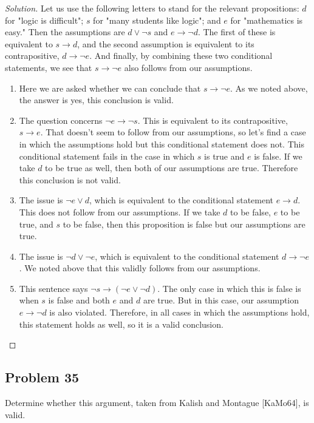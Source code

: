 \documentclass{article}
\newenvironment{solution}{\renewcommand\qedsymbol{}\begin{proof}[Solution]}{\end{proof}}
\begin{document}
\begin{solution}
Let us use the following letters to stand for the relevant propositions: $d$ for "logic is difficult"; $s$ for "many students like logic"; and $e$ for "mathematics is easy." Then the assumptions are $d \lor \neg s$ and $e \rightarrow \neg d$.  The first of these is equivalent to $s \rightarrow d$, and the second assumption is equivalent to its contrapositive, $d \rightarrow \neg e$. And finally, by combining these two conditional statements, we see that $s \rightarrow \neg e$ also follows from our assumptions.

\begin{enumerate}[leftmargin=16pt, topsep = 8pt]
\item Here we are asked whether we can conclude that $s \rightarrow \neg e$. As we noted above, the answer is yes, this conclusion is valid.
\item The question concerns $\neg e \rightarrow \neg s$. This is equivalent to its contrapositive, $s \rightarrow e$. That doesn't seem to follow from our assumptions, so let's find a case in which the assumptions hold but this conditional statement does not. This conditional statement fails in the case in which $s$ is true and $e$ is false. If we take $d$ to be true as well, then both of our assumptions are true. Therefore this conclusion is not valid.
\item The issue is $\neg e \lor d$, which is equivalent to the conditional statement $e \rightarrow d$. This does not follow from our assumptions. If we take $d$ to be false, $e$ to be true, and $s$ to be false, then this proposition is false but our assumptions are true.
\item The issue is $\neg d \lor \neg e$, which is equivalent to the conditional statement $d \rightarrow \neg e$. We noted above that this validly follows from our assumptions.
\item This sentence says $\neg s \rightarrow (\neg e \lor \neg d)$. The only case in which this is false is when $s$ is false and both $e$ and $d$ are true. But in this case, our assumption $e \rightarrow \neg d$ is also violated. Therefore, in all cases in which the assumptions hold, this statement holds as well, so it is a valid conclusion.
\end{enumerate}
\end{solution}

\subsection*{Problem 35}
Determine whether this argument, taken from Kalish and Montague [KaMo64], is valid.
\end{document}
